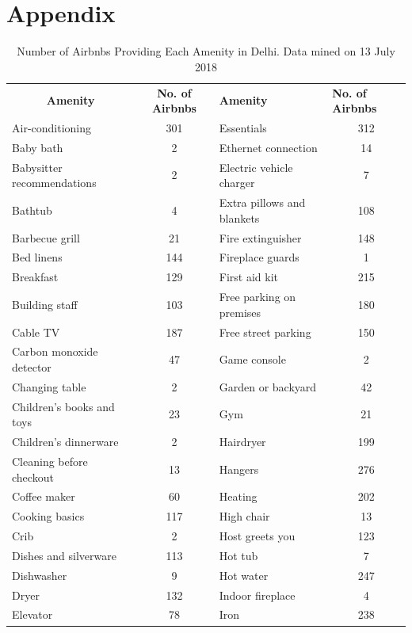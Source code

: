 \documentclass[a4paper, 12pt]{article}
\begin{document}
\section*{Appendix}
\begin{table}[htbp]
  \centering
  \caption{Number of Airbnbs Providing Each Amenity in Delhi. Data mined on 13 July 2018}
    \begin{tabular}{p{10.285em}cp{10.285em}c}
    \multicolumn{1}{c}{\textbf{Amenity}} & \multicolumn{1}{p{8em}}{\textbf{No. of Airbnbs}} & \textbf{Amenity} & \multicolumn{1}{l}{\textbf{No. of Airbnbs}} \\
    Air-conditioning & 301   & Essentials & 312 \\
    Baby bath & 2     & Ethernet connection & 14 \\
    Babysitter recommendations & 2     & Electric vehicle charger & 7 \\
    Bathtub & 4     & Extra pillows and blankets & 108 \\
    Barbecue grill & 21    & Fire extinguisher & 148 \\
    Bed linens & 144   & Fireplace guards & 1 \\
    Breakfast & 129   & First aid kit & 215 \\
    Building staff & 103   & Free parking on premises & 180 \\
    Cable TV & 187   & Free street parking & 150 \\
    Carbon monoxide detector & 47    & Game console & 2 \\
    Changing table & 2     & Garden or backyard & 42 \\
    Children's books and toys & 23    & Gym   & 21 \\
    Children's dinnerware & 2     & Hairdryer & 199 \\
    Cleaning before checkout & 13    & Hangers & 276 \\
    Coffee maker & 60    & Heating & 202 \\
    Cooking basics & 117   & High chair & 13 \\
    Crib  & 2     & Host greets you & 123 \\
    Dishes and silverware & 113   & Hot tub & 7 \\
    Dishwasher & 9     & Hot water & 247 \\
    Dryer & 132   & Indoor fireplace & 4 \\
    Elevator & 78    & Iron  & 238 \\

\end{tabular}
\end{table}
\end{document}
